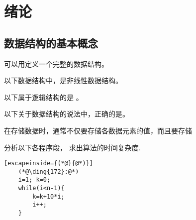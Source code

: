 \clearpage
\clearpage
\section{绪论}
\subsection{数据结构的基本概念}
\qnum \quad {}

\begin{questions}[strp]
    \begin{bbox}
        \question[2] 可以用\blankbox 定义一个完整的数据结构。
    \end{bbox}

    \begin{bbox}
        \question[2] 以下数据结构中，\blankbox 是非线性数据结构。
    \end{bbox}

    \begin{bbox}
 
        \question[2] 以下属于逻辑结构的是 \blankbox 。
        
    \end{bbox}

 

    \begin{bbox}
        \question[2] 以下关于数据结构的说法中，正确的是\blankbox 。
    \end{bbox}

    \begin{bbox}
        \question[2] 在存储数据时，通常不仅要存储各数据元素的值，而且要存储\blankbox
    \end{bbox}

    \begin{bbox}
        \question[2] 分析以下各程序段， 求出算法的时间复杂度.
        \begin{lstlisting}[escapeinside={(*@}{@*)}]
    (*@\ding{172}:@*)
    i=1; k=0;
    while(i<n-1){
        k=k+10*i;
        i++;
    }


\end{lstlisting}
\end{bbox}
\end{questions}
